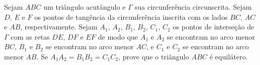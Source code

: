Sejam $ABC$ um triângulo acutângulo e $\Gamma$ sua circunferência circunscrita.
Sejam $D$, $E$ e $F$ os pontos de tangência da circunferência inscrita com os lados $BC$, $AC$ e $AB$, respectivamente.
Sejam $A_1$, $A_2$, $B_1$, $B_2$, $C_1$, $C_2$ os pontos de interseção de $\Gamma$ com as retas $DE$, $DF$ e $EF$ de modo que $A_1$ e $A_2$ se encontram no arco menor $BC$, $B_1$ e $B_2$ se encontram no arco menor $AC$, e $C_1$ e $C_2$ se encontram no arco menor $AB$. Se $A_1A_2 = B_1B_2 = C_1C_2$, prove que o triângulo $ABC$ é equilátero.
